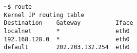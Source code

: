 \documentclass[varwidth,crop]{standalone}
\begin{document}
\begin{verbatim}
~$ route
Kernel IP routing table
Destination    Gateway          Iface
localnet       *                eth0
192.168.128.0  *                eth0
default        202.203.132.254  eth0
\end{verbatim}
\end{document}
